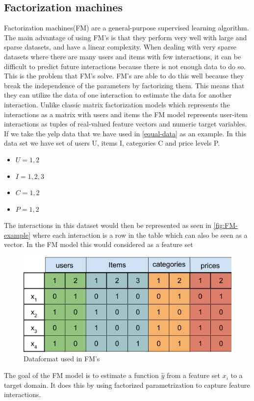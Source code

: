 \subsection{Factorization machines}
Factorization machines(FM) are a general-purpose supervised learning algorithm.
The main advantage of using FM's is that they perform very well with large and sparse datasets, and have a linear complexity.
When dealing with very sparse datasets where there are many users and items with few interactions, it can be difficult to predict future interactions because there is not enough data to do so.
This is the problem that FM's solve.
FM's are able to do this well because they break the independence of the parameters by factorizing them.
This means that they can utilize the data of one interaction to estimate the data for another interaction.
Unlike classic matrix factorization models which represents the interactions as a matrix with users and items the FM model represents user-item interactions as tuples of real-valued feature vectors and numeric target variables.
If we take the yelp data that we have used in \autoref{equal-data} as an example.
In this data set we have set of users U, items I, categories C and price levels P.
\begin{itemize}
	\item $U = {1, 2}$
	\item $I = {1, 2 ,3}$
	\item $C = {1, 2}$
	\item $P = {1, 2}$
\end{itemize}
The interactions in this dataset would then be represented as seen in \autoref{fig:FM-example} where each interaction is a row in the table which can also be seen as a vector.
In the FM model this would considered as a feature set
\begin{figure}
    \centering
    \includegraphics[scale=0.5]{figures/FM-example.png}
    \caption{Dataformat used in FM's}
    \label{fig:FM-example}
\end{figure}
The goal of the FM model is to estimate a function $\hat{y}$ from a feature set $x_i$ to a target domain. 
It does this by using factorized parametrization to capture feature interactions.

